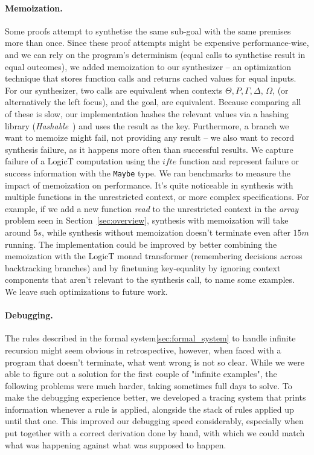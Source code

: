 \documentclass{llncs}
\newcommand{\mypara}[1]{\paragraph{\textbf{#1}.}}
\def\Rho{P}
\begin{document}
\mypara{Memoization} Some proofs attempt to synthetise the same
sub-goal with the same premises more than once. Since these proof
attempts might be expensive performance-wise, and we can rely on the
program's determinism (equal calls to synthetise result in equal
outcomes), we added memoization to our synthesizer -- an optimization
technique that stores function calls and returns cached values for
equal inputs.
%
For our synthesizer, two calls are equivalent when
contexts $\Theta, \Rho, \Gamma, \Delta$, $\Omega$, (or alternatively
the left focus), and the goal, are equivalent. Because comparing all
of these is slow, our implementation hashes the relevant values via a hashing
library (\emph{Hashable}~\cite{https://hackage.haskell.org/package/hashable}) and
uses the result as the key.
%
Furthermore, a branch we want to memoize
might fail, not providing any result -- we also want to record
synthesis failure, as it happens more often than successful
results. We capture failure of a LogicT computation using the $\mathit{ifte}$
function and represent failure or success information with the \texttt{Maybe}
type. We ran benchmarks to measure the impact of memoization on 
performance. It's quite noticeable in synthesis with multiple
functions in the unrestricted context, or more complex
specifications. For example, if we add a new function \emph{read} to
the unrestricted context in the \emph{array} problem seen in
Section~\ref{sec:overview}, synthesis with memoization will take
around $5s$, while synthesis without memoization doesn't terminate
even after $15m$ running.
%
The implementation could be improved by better combining the
memoization with the LogicT monad transformer (remembering decisions across
backtracking branches) and by finetuning key-equality by ignoring context
components that aren't relevant to the synthesis call, to name some
examples. We leave such optimizations to future work.



\mypara{Debugging} The rules described in the formal
system\ref{sec:formal_system} to handle infinite recursion might seem obvious in
retrospective, however, when faced with a program that doesn't terminate, what
went wrong is not so clear. While we were able to figure out a solution for the
first couple of "infinite examples", the following problems were much harder,
taking sometimes full days to solve. To make the debugging experience better, we
developed a tracing system that prints information whenever a rule is applied,
alongside the stack of rules applied up until that one. This improved our
debugging speed considerably, especially when put together with a correct
derivation done by hand, with which we could match what was happening against
what was supposed to happen.
\end{document}
